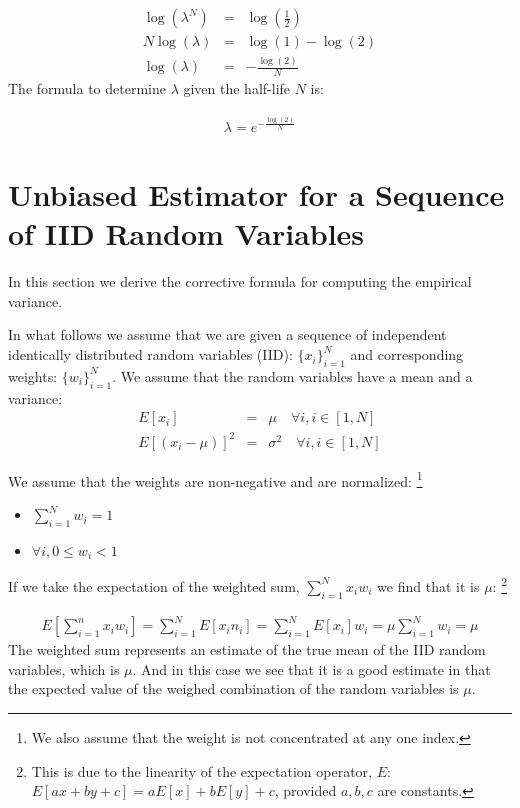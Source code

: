 \documentclass{article}
\begin{document}
\begin{eqnarray*}
    \log(\lambda^N) & = & \log(\frac{1}{2}) \\
    N \log(\lambda) & = & \log(1) - \log(2) \\
    \log(\lambda) & = & -\frac{\log(2)}{N}
\end{eqnarray*}
The formula to determine $\lambda$ given the half-life $N$ is:

\begin{eqnarray}
    \lambda = e^{-\frac{\log(2)}{N}}
\end{eqnarray}

\appendix

\section{Unbiased Estimator for a Sequence of IID Random Variables}
In this section we derive the corrective formula for computing the empirical variance.

In what follows we assume that we are given a sequence of independent identically distributed random variables (IID):
$\{x_i\}_{i=1}^N$ and corresponding weights: $\{w_i\}_{i=1}^N$.
We assume that the random variables have a mean and a variance:
\begin{eqnarray}
    E[x_i] & = & \mu  \quad \forall i, i \in [1, N] \\
    E[(x_i - \mu)]^2 & = & \sigma^2 \quad \forall i, i \in [1, N] 
\end{eqnarray}

We assume that the weights are non-negative and are normalized:%
\footnote{We also assume that the weight is not concentrated at any
one index.}
\begin{itemize}
    \item{$\sum_{i=1}^N w_i = 1$}
    \item{$\forall i, 0 \le w_i < 1$}
\end{itemize}

If we take the expectation of the weighted sum, $\sum_{i=1}^N x_i w_i$ we find that it is $\mu$:%
\footnote{This is due to the linearity of the expectation operator, $E$:
$E[a x + b y + c] = a E[x] + b E[y] + c$, provided $a,b,c$ are constants.}

\begin{eqnarray}
    E\left[\sum_{i=1}^n x_i w_i\right] = \sum_{i=1}^N E[x_i n_i ] = \sum_{i=1}^N E[x_i] w_i = \mu \sum_{i=1}^N w_i = \mu
\end{eqnarray}
The weighted sum represents an estimate of the true mean of the IID random variables, which is $\mu$.
And in this case we see that it is a good estimate in that the expected value of the weighed combination
of the random variables is $\mu$. 
\end{document}
